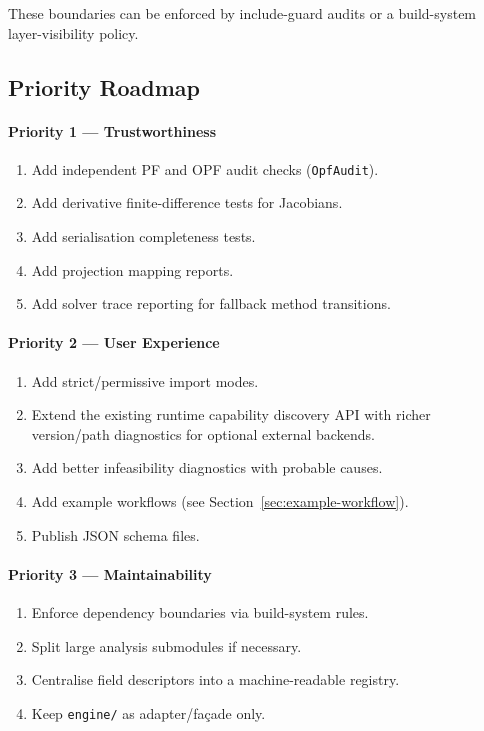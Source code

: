 These boundaries can be enforced by include-guard audits or a build-system
layer-visibility policy.

\subsection{Priority Roadmap}
\label{sec:roadmap}

\paragraph{Priority 1 --- Trustworthiness}
\begin{enumerate}
  \item Add independent PF and OPF audit checks (\texttt{OpfAudit}).
  \item Add derivative finite-difference tests for Jacobians.
  \item Add serialisation completeness tests.
  \item Add projection mapping reports.
  \item Add solver trace reporting for fallback method transitions.
\end{enumerate}

\paragraph{Priority 2 --- User Experience}
\begin{enumerate}
  \item Add strict/permissive import modes.
  \item Extend the existing runtime capability discovery API with richer
        version/path diagnostics for optional external backends.
  \item Add better infeasibility diagnostics with probable causes.
  \item Add example workflows (see Section~\ref{sec:example-workflow}).
  \item Publish JSON schema files.
\end{enumerate}

\paragraph{Priority 3 --- Maintainability}
\begin{enumerate}
  \item Enforce dependency boundaries via build-system rules.
  \item Split large analysis submodules if necessary.
  \item Centralise field descriptors into a machine-readable registry.
  \item Keep \texttt{engine/} as adapter/fa\c{c}ade only.
\end{enumerate}

